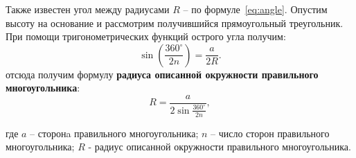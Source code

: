 \documentclass{article}
\begin{document}
Также известен угол между радиусами $R$ -- по формуле~\eqref{eq:angle}. Опустим 
высоту на 
основание и рассмотрим получившийся прямоугольный треугольник. При помощи 
тригонометрических функций острого угла получим:
\begin{equation}\label{eq:sin}
  \sin \left( \frac{360^{\circ}}{2n} \right)
  = \frac{a}{2R}.
\end{equation}
отсюда получим формулу 
\textbf{радиуса описанной окружности правильного многоугольника}:
\begin{equation}\label{eq:result}
  R = \frac{a}{2\sin \frac{360^{\circ}}{2n}},
\end{equation}

где $a$ -- сторонa правильного многоугольника; $n$ -- число сторон правильного 
многоугольника; $R$ - радиус описанной окружности правильного многоугольника.
\end{document}
